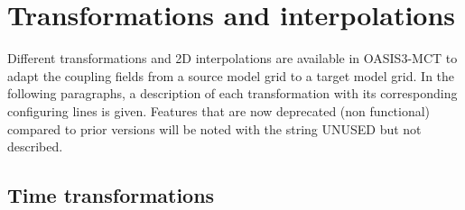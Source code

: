 \newpage
\chapter{Transformations and interpolations}
\label{sec_transformations}

Different transformations and 2D interpolations are available in
OASIS3-MCT to adapt the coupling fields from a source model grid to a target
model grid. 
In the following paragraphs, a description of each
transformation with its corresponding configuring lines is given.
Features that are now deprecated (non functional) compared
to prior versions will be noted with the string UNUSED
but not described.

\section{Time transformations}
\label{subsec_timetrans}

